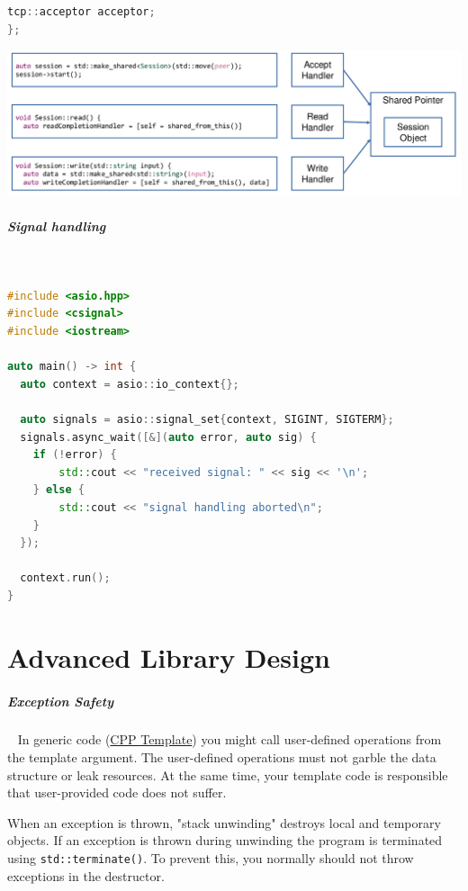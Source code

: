 \documentclass[11pt,twoside,landscape]{article}
\begin{document}
\begin{multicols}{2}
\begin{lstlisting}[language=c++,label=lst:async-example-using-asio,caption={Async Example using ASIO},captionpos=b,numbers=none]
  tcp::acceptor acceptor;
};
\end{lstlisting}


{
\begin{center}
\includegraphics[width=.9\linewidth]{img/asio_keep_session_alive.png}
\end{center}
\label{fig:keep-session-alive}
}
\subparagraph{Signal handling} \
\label{sec:org8722f3c}
\begin{lstlisting}[language=c++,label=lst:example-for-signal-handling-using-asio,caption={Example for signal handling using ASIO},captionpos=b,numbers=none]
#include <asio.hpp>
#include <csignal>
#include <iostream>

auto main() -> int {
  auto context = asio::io_context{};

  auto signals = asio::signal_set{context, SIGINT, SIGTERM};
  signals.async_wait([&](auto error, auto sig) {
    if (!error) {
        std::cout << "received signal: " << sig << '\n';
    } else {
        std::cout << "signal handling aborted\n";
    }
  });

  context.run();
}
\end{lstlisting}

\section{Advanced Library Design}
\label{sec:org7b6980e}
\subparagraph{Exception Safety} \
\label{sec:org1790a0d}
In generic code (\href{../../../roam/20230629084234-cpp_template.org}{CPP Template}) you might call user-defined operations from the template argument.
The user-defined operations must not garble the data structure or leak resources.
At the same time, your template code is responsible that user-provided code does not suffer.

When an exception is thrown, "stack unwinding" destroys local and temporary objects.
If an exception is thrown during unwinding the program is terminated using \texttt{std::terminate()}.
To prevent this, you normally should not throw exceptions in the destructor.


\end{multicols}
\end{document}
